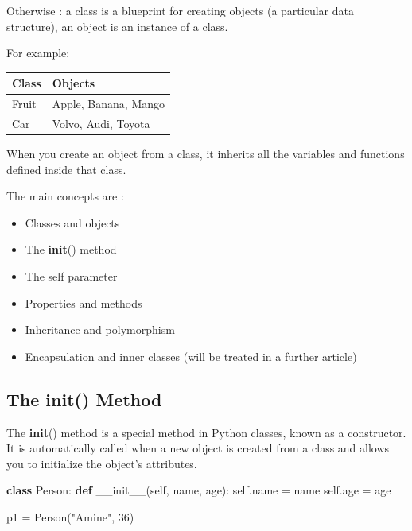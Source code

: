 \documentclass[11pt]{article}
\providecommand{\tightlist}{%
      \setlength{\itemsep}{0pt}\setlength{\parskip}{0pt}}
\newenvironment{Shaded}{}{}
\newcommand{\KeywordTok}[1]{\textcolor[rgb]{0.00,0.44,0.13}{\textbf{{#1}}}}
\newcommand{\DecValTok}[1]{\textcolor[rgb]{0.25,0.63,0.44}{{#1}}}
\newcommand{\StringTok}[1]{\textcolor[rgb]{0.25,0.44,0.63}{{#1}}}
\newcommand{\FunctionTok}[1]{\textcolor[rgb]{0.02,0.16,0.49}{{#1}}}
\newcommand{\NormalTok}[1]{{#1}}
\newcommand{\VariableTok}[1]{\textcolor[rgb]{0.10,0.09,0.49}{{#1}}}
\newcommand{\OperatorTok}[1]{\textcolor[rgb]{0.40,0.40,0.40}{{#1}}}
\begin{document}
Otherwise : a class is a blueprint for creating objects (a particular data
structure), an object is an instance of a class.

For example:

\begin{table}[htbp]
\centering
\begin{tabular}{|l|p{6cm}|}
\hline
\textbf{Class} & \textbf{Objects} \\ \hline
Fruit & Apple, Banana, Mango \\ \hline
Car   & Volvo, Audi, Toyota \\ \hline
\end{tabular}
\end{table}


When you create an object from a class, it inherits all the variables
and functions defined inside that class.

The main concepts are :  
\begin{itemize}
\tightlist
\item
    Classes and objects 
\item
    The \textbf{init}() method 
\item
    The self parameter 
\item
    Properties and methods 
\item
    Inheritance and polymorphism 
\item
    Encapsulation and inner classes (will be treated in a further article)
\end{itemize}


\subsection{\texorpdfstring{The \textbf{init}()
Method}{The init() Method}}\label{the-init-method}

The \textbf{init}() method is a special method in Python classes, known
as a constructor. It is automatically called when a new object is
created from a class and allows you to initialize the object's
attributes.

\begin{Shaded}
\begin{Highlighting}[]
\KeywordTok{class}\NormalTok{ Person:}
    \KeywordTok{def} \FunctionTok{\_\_init\_\_}\NormalTok{(}\VariableTok{self}\NormalTok{, name, age):}
        \VariableTok{self}\NormalTok{.name }\OperatorTok{=}\NormalTok{ name}
        \VariableTok{self}\NormalTok{.age }\OperatorTok{=}\NormalTok{ age}

\NormalTok{p1 }\OperatorTok{=}\NormalTok{ Person(}\StringTok{"Amine"}\NormalTok{, }\DecValTok{36}\NormalTok{)}
\end{Highlighting}
\end{Shaded}
\end{document}

